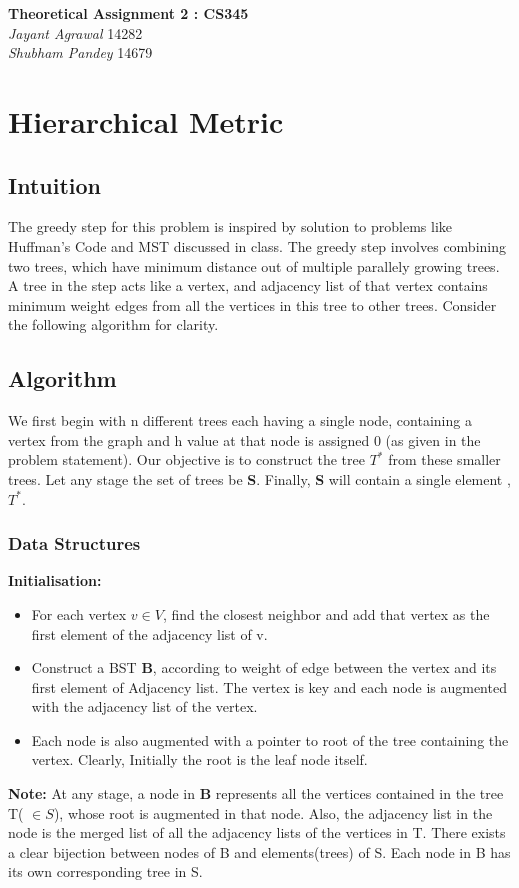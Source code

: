 \documentclass{article}
\begin{document}

\begin{center}
\textbf{\Large Theoretical Assignment 2 : CS345} \\
\textit{\large Jayant Agrawal}         14282 \\
\textit{\large Shubham Pandey}         14679
\end{center}

\section{Hierarchical Metric}
\subsection{Intuition}
The greedy step for this problem is inspired by solution to problems like Huffman's Code and MST discussed in class. The greedy step involves combining two trees, which have minimum distance out of multiple parallely growing trees. A tree in the step acts like a vertex, and adjacency list of that vertex contains minimum weight edges from all the vertices in this tree to other trees. Consider the following algorithm for clarity.

\subsection{Algorithm}
We first begin with n different trees each having a single node, containing a vertex from the graph and h value at that node is assigned 0 (as given in the problem statement). Our objective is to construct the tree \textbf{$T^*$} from these smaller trees. Let any stage the set of trees be \textbf{S}. Finally, \textbf{S} will contain a single element , \textbf{$T^*$}.
\subsubsection{Data Structures}

\textbf{Initialisation: }
\begin{itemize}
\item For each vertex $v \in V$, find the closest neighbor and add that vertex as the first element of the adjacency list of v.
\item Construct a BST \textbf{B}, according to weight of edge between the vertex and its first element of Adjacency list. The vertex is key and each node is augmented with the adjacency list of the vertex. 
\item Each node is also augmented with a pointer to root of the tree containing the vertex. Clearly, Initially the root is the leaf node itself.
\end{itemize}
\textbf{Note:} At any stage, a node in \textbf{B} represents all the vertices contained in the tree T( $\in S$), whose root is augmented in that node. Also, the adjacency list in the node is the merged list of all the adjacency lists of the vertices in T. There exists a clear bijection between nodes of B and elements(trees) of S. Each node in B has its own corresponding tree in S.
\end{document}
